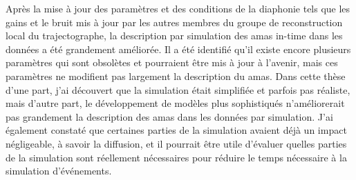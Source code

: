 
Après la mise à jour des paramètres et des conditions de la diaphonie tels que les gains et le bruit mis à jour par les autres membres du groupe de reconstruction local du trajectographe, la description par simulation des amas in-time dans les données a été grandement améliorée. Il a été identifié qu'il existe encore plusieurs paramètres qui sont obsolètes et pourraient être mis à jour à l'avenir, mais ces paramètres ne modifient pas largement la description du amas. Dans cette thèse d'une part, j'ai découvert que la simulation était simplifiée et parfois pas réaliste, mais d'autre part, le développement de modèles plus sophistiqués n'améliorerait pas grandement la description des amas dans les données par simulation. J'ai également constaté que certaines parties de la simulation avaient déjà un impact négligeable, à savoir la diffusion, et il pourrait être utile d'évaluer quelles parties de la simulation sont réellement nécessaires pour réduire le temps nécessaire à la simulation d'événements.


